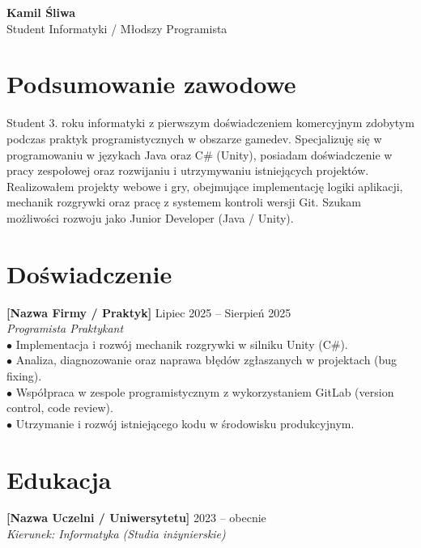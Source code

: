 \documentclass[10pt,a4paper,sans]{article}
\begin{document}
\begin{minipage}[t]{13.5cm} %
    \vspace{1.5cm}

    {\Huge \textbf{Kamil Śliwa}} \\
    {\large \textcolor{maindark}{Student Informatyki / Młodszy Programista}}

    \vspace{0.5cm}

    \section*{Podsumowanie zawodowe}
    Student 3. roku informatyki z pierwszym doświadczeniem komercyjnym zdobytym podczas praktyk programistycznych w obszarze gamedev. Specjalizuję się w programowaniu w językach Java oraz C\# (Unity), posiadam doświadczenie w pracy zespołowej oraz rozwijaniu i utrzymywaniu istniejących projektów. Realizowałem projekty webowe i gry, obejmujące implementację logiki aplikacji, mechanik rozgrywki oraz pracę z systemem kontroli wersji Git. Szukam możliwości rozwoju jako Junior Developer (Java / Unity).

    \section*{Doświadczenie}
    \textbf{[Nazwa Firmy / Praktyk]} \hfill Lipiec 2025 -- Sierpień 2025 \\
    \textit{Programista Praktykant} \\
    $\bullet$ Implementacja i rozwój mechanik rozgrywki w silniku Unity (C\#). \\
    $\bullet$ Analiza, diagnozowanie oraz naprawa błędów zgłaszanych w projektach (bug fixing). \\
    $\bullet$ Współpraca w zespole programistycznym z wykorzystaniem GitLab (version control, code review). \\
    $\bullet$ Utrzymanie i rozwój istniejącego kodu w środowisku produkcyjnym.

    \section*{Edukacja}
    \textbf{[Nazwa Uczelni / Uniwersytetu]} \hfill 2023 -- obecnie \\
    \textit{Kierunek: Informatyka (Studia inżynierskie)} \\


\end{minipage}
\end{document}
